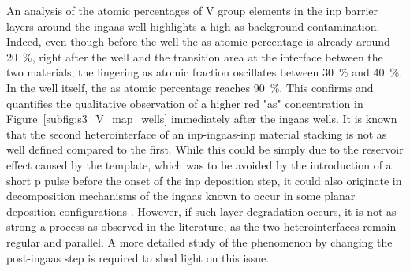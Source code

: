 An analysis of the atomic percentages of V group elements in the \acs{inp} barrier layers around the \acs{ingaas} well highlights a high \acl{as} background contamination. Indeed, even though before the well the \acl{as} atomic percentage is already around \qty{20}{\%}, right after the well and the transition area at the interface between the two materials, the lingering \acl{as} atomic fraction oscillates between \qty{30}{\%} and \qty{40}{\%}. In the well itself, the \acl{as} atomic percentage reaches \qty{90}{\%}. This confirms and quantifies the qualitative observation of a higher red "\acl{as}" concentration in Figure~\ref{subfig:s3_V_map_wells} immediately after the \acs{ingaas} wells. It is known that the second heterointerface of an \acs{inp}-\acs{ingaas}-\acs{inp} material stacking is not as well defined compared to the first. While this could be simply due to the reservoir effect caused by the template, which was to be avoided by the introduction of a short \acl{p} pulse before the onset of the \acs{inp} deposition step, it could also originate in decomposition mechanisms of the \acs{ingaas} known to occur in some planar deposition configurations \cite{Decobert2002}. However, if such layer degradation occurs, it is not as strong a process as observed in the literature, as the two heterointerfaces remain regular and parallel. A more detailed study of the phenomenon by changing the post-\acs{ingaas} step is required to shed light on this issue.



